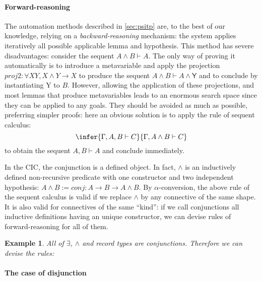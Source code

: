 \documentclass[twoside,a4paper,12pt]{article}
\newtheorem{example}{Example}
\begin{document}
\paragraph{Forward-reasoning}

The automation methods described in \ref{sec:psitp} are, to the best
of our knowledge, relying on a \emph{backward-reasoning} mechanism:
the system applies iteratively all possible applicable lemma and
hypothesis. This method has severe disadvantages: consider the sequent
$A\wedge B\vdash A$. The only way of proving it automatically is to
introduce a metavariable and apply the projection $proj2 : \forall X
Y, X\wedge Y \to X$ to produce the sequent $A\wedge B\vdash A\wedge
\mathsf{Y}$ and to conclude by instantiating \textsf{Y} to
$B$. However, allowing the application of these projections, and most
lemmas that produce metavariables leads to an enormous search space
since they can be applied to any goals. They should be avoided as much
as possible, preferring simpler proofs: here an obvious solution is to
apply the rule of sequent calculus:
$$ \infer{\Gamma, A, B\vdash C}{\Gamma, A\wedge B\vdash C} $$
to obtain the sequent $A,B\vdash A$ and conclude immediately.

In the CIC, the conjunction is a defined object. In fact, $\wedge$ is
an inductively defined non-recursive predicate with one constructor
and two independent hypothesis: $A\wedge B := conj : A \to B \to
A\wedge B$. By $\alpha$-conversion, the above rule of the sequent
calculus is valid if we replace $\wedge$ by any connective of the same
shape. It is also valid for connectives of the same ``kind'': if we call
conjunctions all inductive definitions having an unique constructor,
we can devise rules of forward-reasoning for all of them.
\begin{example} All of $\exists$, $\wedge$ and record types are
  conjunctions. Therefore we can devise the rules:
\end{example}

\paragraph{The case of disjunction}
\end{document}
